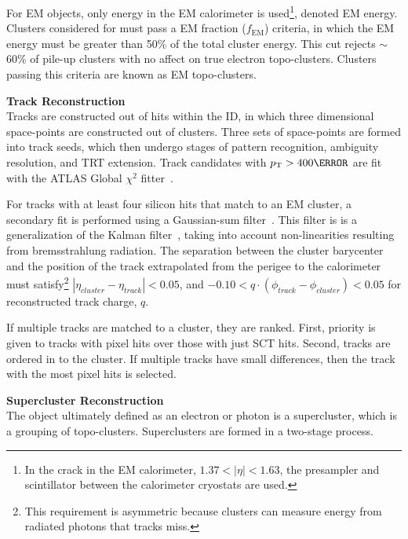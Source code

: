 For \gls{EM} objects, only energy in the \gls{EM} calorimeter is used\footnote{In the crack in the \gls{EM} calorimeter, $1.37<|\eta|<1.63$, the presampler and scintillator between the calorimeter cryostats are used.}, denoted \gls{EM} energy. Clusters considered for must pass a \gls{EM} fraction ($f_{\text{EM}}$) criteria, in which the \gls{EM} energy must be greater than 50\% of the total cluster energy. This cut rejects $\sim$60\% of pile-up clusters with no affect on true electron topo-clusters. Clusters passing this criteria are known as \gls{EM} topo-clusters.

\noindent\textbf{Track Reconstruction}\\ %
\indent Tracks are constructed out of hits within the \gls{ID}, in which three dimensional space-points are constructed out of clusters. Three sets of space-points are formed into track seeds, which then undergo stages of pattern recognition, ambiguity resolution, and \gls{TRT} extension. Track candidates with $\pt > \unit{400}{\MeV}$ are fit with the ATLAS Global $\chi^2$ fitter~\cite{chi-2-fitter}.

For tracks with at least four silicon hits that match to an \gls{EM} cluster, a secondary fit is performed using a Gaussian-sum filter~\cite{gaussian-sum-filter}. This filter is is a generalization of the Kalman filter~\cite{kalman-filter}, taking into account non-linearities resulting from bremsstrahlung radiation. The separation between the cluster barycenter and the position of the track extrapolated from the perigee to the calorimeter must satisfy\footnote{This requirement is asymmetric because clusters can measure energy from radiated photons that tracks miss.} $|\eta_{cluster} - \eta_{track}| < 0.05$, and $-0.10 < q \cdot (\phi_{track}-\phi_{cluster}) < 0.05$ for reconstructed track charge, $q$.


If multiple tracks are matched to a cluster, they are ranked. First, priority is given to tracks with pixel hits over those with just \gls{SCT} hits. Second, tracks are ordered in \Dr to the cluster. If multiple tracks have small \Dr differences, then the track with the most pixel hits is selected. 


\noindent\textbf{Supercluster Reconstruction}\\ 
\indent The object ultimately defined as an electron or photon is a supercluster, which is a grouping of topo-clusters.  Superclusters are formed in a two-stage process.

